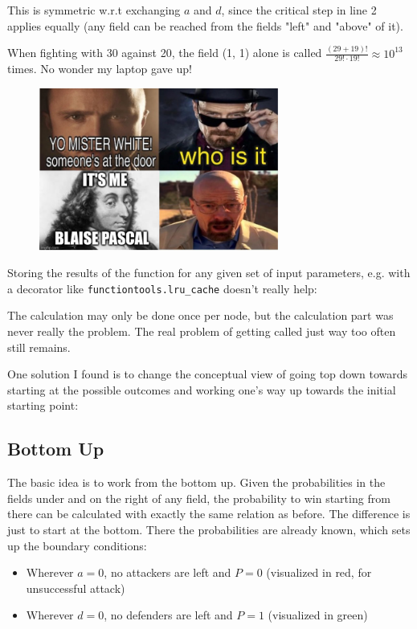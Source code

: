 \documentclass[11pt,a4paper]{article}
\begin{document}
    This is symmetric w.r.t exchanging $a$ and $d$, since the critical step in line 2 applies equally (any field can be reached from the fields "left" and "above" of it).

    When fighting with 30 against 20, the field (1, 1) alone is called $\frac{(29 + 19)!}{29! \cdot 19!} \approx 10^{13}$ times.
    No wonder my laptop gave up!

    \begin{figure}[H]
        \centering
        \includegraphics[width=0.7\textwidth]{../images/pascale meme2.jpg}
    \end{figure}

    Storing the results of the function for any given set of input parameters, e.g. with a decorator like \texttt{functiontools.lru\_cache} doesn't really help:

    The calculation may only be done once per node, but the calculation part was never really the problem.
    The real problem of getting called just way too often still remains.

    One solution I found is to change the conceptual view of going top down towards starting at the possible outcomes and working one's way up towards the initial starting point:

    \subsection{Bottom Up}
    The basic idea is to work from the bottom up.
    Given the probabilities in the fields under and on the right of any field, the probability to win starting from there can be calculated with exactly the same relation as before.
    The difference is just to start at the bottom.
    There the probabilities are already known, which sets up the boundary conditions:

    \begin{itemize}
        \item Wherever $a=0$, no attackers are left and $P=0$ (visualized in red, for unsuccessful attack)
        \item Wherever $d=0$, no defenders are left and $P=1$ (visualized in green)
    \end{itemize}
\end{document}
